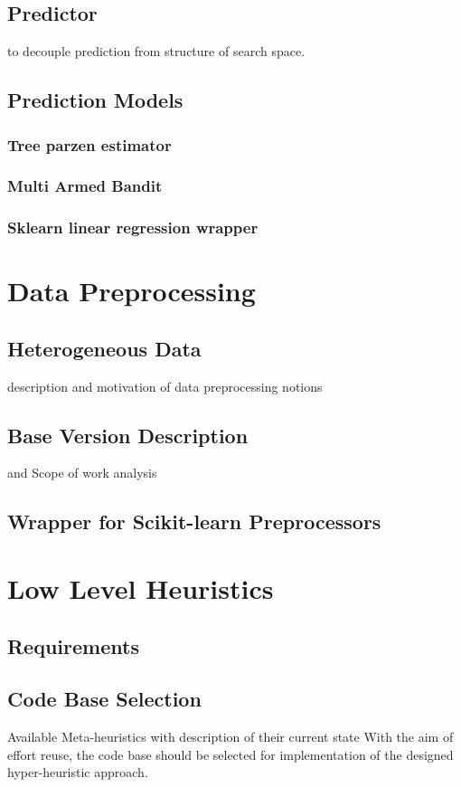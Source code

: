 \subsection{Predictor}
to decouple prediction from structure of search space.

\subsection{Prediction Models}
\subsubsection{Tree parzen estimator}
\subsubsection{Multi Armed Bandit}
\subsubsection{Sklearn linear regression wrapper}


\section{Data Preprocessing}
\subsection{Heterogeneous Data} description and motivation of data preprocessing notions

\subsection{Base Version Description} and Scope of work analysis
\subsection{Wrapper for Scikit-learn Preprocessors}


\section{Low Level Heuristics}

\subsection{Requirements}

\subsection{Code Base Selection}\label{implementation:llh code basis selection}
Available Meta-heuristics with description of their current state
With the aim of effort reuse, the code base should be selected for implementation of the designed hyper-heuristic approach.

